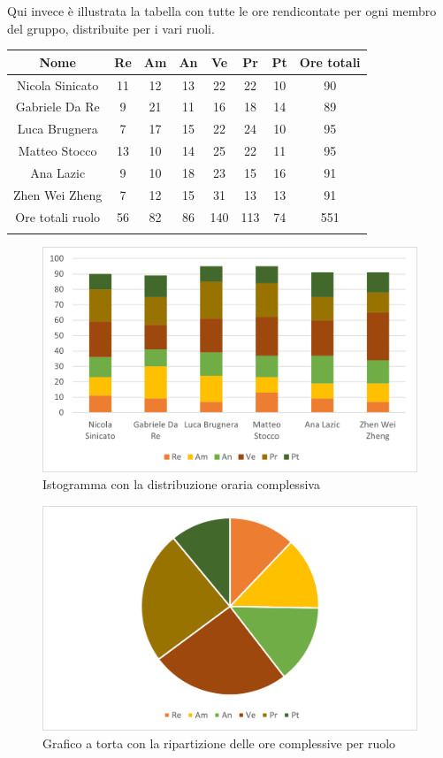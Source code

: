 Qui invece è illustrata la tabella con tutte le ore rendicontate per ogni membro del gruppo, distribuite per i vari ruoli.
\setlength\extrarowheight{5pt}
\begin{tabularx}{\textwidth}{|ccccccc|c|}
	\hline
	\rowcolor{white}
	\textbf{Nome} & \textbf{Re} & \textbf{Am} & \textbf{An} & \textbf{Ve} & \textbf{Pr}& \textbf{Pt} & \textbf{Ore totali} \\
	\hline
	Nicola Sinicato &11&12&13&22&22&10&90 \\
	Gabriele Da Re &9&21&11&16&18&14&89 \\
	Luca Brugnera &7&17&15&22&24&10&95 \\
	Matteo Stocco &13&10&14&25&22&11&95 \\
	Ana Lazic &9&10&18&23&15&16&91 \\
	Zhen Wei Zheng &7&12&15&31&13&13&91 \\
	\hline
	Ore totali ruolo &56&82&86&140&113&74&551 \\
	\hline
	\rowcolor{white}
	\caption{Ripartizione complessiva delle ore per ruolo e persona}
\end{tabularx}

\begin{figure}[H]
	\centering
	\includegraphics[scale=0.8]{img/consuntivo_membri.png}
	\caption{Istogramma con la distribuzione oraria complessiva}
\end{figure}
\begin{figure}[H]
	\centering
	\includegraphics[scale=0.8]{img/consuntivo_ruoli.png}
	\caption{Grafico a torta con la ripartizione delle ore complessive per ruolo}
\end{figure}
